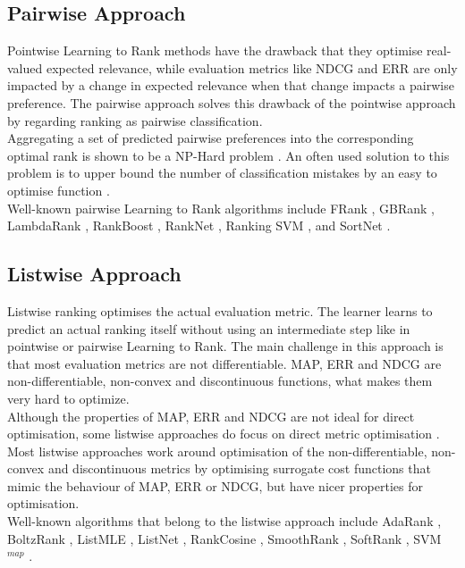 \subsection{Pairwise Approach}
Pointwise Learning to Rank methods have the drawback that they optimise real-valued expected relevance, while evaluation metrics like \ac{NDCG} and \ac{ERR} are only impacted by a change in expected relevance when that change impacts a pairwise preference. The pairwise approach solves this drawback of the pointwise approach by regarding ranking as pairwise classification.\\

Aggregating a set of predicted pairwise preferences into the corresponding optimal rank is shown to be a NP-Hard problem \cite{Feldman2012}. An often used solution to this problem is to upper bound the number of classification mistakes by an easy to optimise function \cite{Bartlett2006}.\\

Well-known pairwise Learning to Rank algorithms include FRank \cite{Tsai2007}, GBRank \cite{Zheng2007}, LambdaRank \cite{Burges2006}, RankBoost \cite{Freund2003}, RankNet \cite{Burges2005}, Ranking \acs{SVM} \cite{Herbrich1999b,Joachims2002}, and SortNet \cite{Rigutini2008}.
\subsection{Listwise Approach}
Listwise ranking optimises the actual evaluation metric. The learner learns to predict an actual ranking itself without using an intermediate step like in pointwise or pairwise Learning to Rank. The main challenge in this approach is that most evaluation metrics are not differentiable. \ac{MAP}, \ac{ERR} and \ac{NDCG} are non-differentiable, non-convex and discontinuous functions, what makes them very hard to optimize.\\

Although the properties of \ac{MAP}, \ac{ERR} and \ac{NDCG} are not ideal for direct optimisation, some listwise approaches do focus on direct metric optimisation \cite{Yue2007, Taylor2008, Chapelle2010}. Most listwise approaches work around optimisation of the non-differentiable, non-convex and discontinuous metrics by optimising surrogate cost functions that mimic the behaviour of \ac{MAP}, \ac{ERR} or \ac{NDCG}, but have nicer properties for optimisation.\\

Well-known algorithms that belong to the listwise approach include AdaRank \cite{Xu2007}, BoltzRank \cite{Volkovs2009}, ListMLE \cite{Xia2008}, ListNet \cite{Cao2007}, RankCosine \cite{Qin2008}, SmoothRank \cite{Chapelle2010}, SoftRank \cite{Taylor2008}, \acs{SVM}$^{map}$ \cite{Yue2007}.

